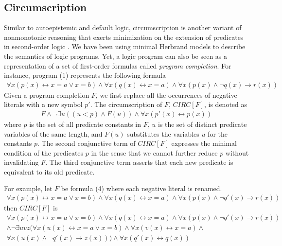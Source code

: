 \subsection{Circumscription}
Similar to autoepistemic and default logic, circumscription is another variant of 
nonmonotonic reasoning that exerts minimization on the extension of predicates in 
second-order logic \cite{lifschitz2}. We have been using minimal Herbrand models to describe the semantics 
of logic programs. Yet, a logic program can also be seen as a representation of a set of 
first-order formulas called \emph{program completion}. For instance, program (1) 
represents the following formula
\begin{align}
    \forall x (p(x) \leftrightarrow x = a \lor x = b) \land 
    \forall x (q(x) \leftrightarrow x = a) \land 
    \forall x (p(x) \land \neg q(x) \rightarrow r(x))
\end{align}
Given a program completion $F$, we first replace all the occurrences of negative literals 
with a new symbol $p'$. The circumscription of $F$, $CIRC[F]$, is denoted as 
\begin{align}
    F \land \neg \exists u((u < p) \land F(u)) \land \forall x (p'(x) \leftrightarrow p(x))
\end{align}
where $p$ is the set of all predicate constants in $F$, $u$ is the set of distinct 
predicate variables of the same length, and $F(u)$ substitutes the variables $u$ for 
the constants $p$. The second conjunctive term of $CIRC[F]$ expresses the minimal 
condition of the predicates $p$ in the sense that we cannot further reduce $p$ without 
invalidating $F$. The third conjunctive term asserts that each new predicate is 
equivalent to its old predicate.

For example, let $F$ be formula (4) where each negative literal is renamed.
\begin{align*}
    \forall x (p(x) \leftrightarrow x = a \lor x = b) \land 
    \forall x (q(x) \leftrightarrow x = a) \land 
    \forall x (p(x) \land \neg q'(x) \rightarrow r(x))
\end{align*}
then $CIRC[F]$ is 
\begin{multline*}
    \forall x (p(x) \leftrightarrow x = a \lor x = b) \land 
    \forall x (q(x) \leftrightarrow x = a) \land 
    \forall x (p(x) \land \neg q'(x) \rightarrow r(x)) \\ 
    \land \neg \exists uvz (
        \forall x (u(x) \leftrightarrow x = a \lor x = b) \land 
        \forall x (v(x) \leftrightarrow x = a) \land 
        \\ \forall x (u(x) \land \neg q'(x) \rightarrow z(x)) 
    ) 
    \land \forall x (q'(x) \leftrightarrow q(x))
\end{multline*}


